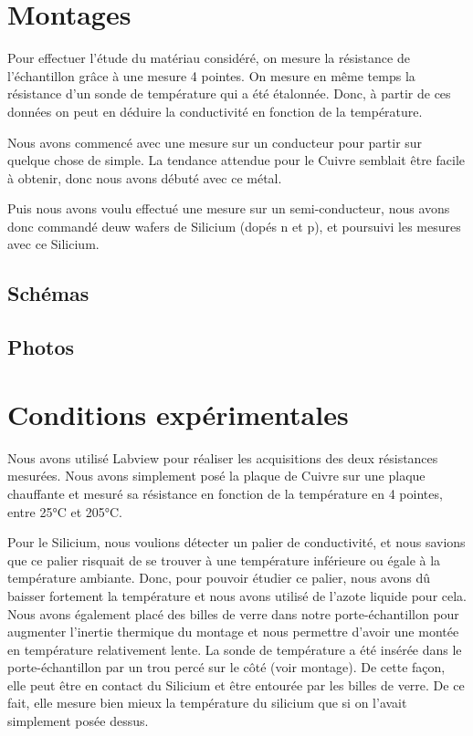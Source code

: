 \section*{Montages}
Pour effectuer l'étude du matériau considéré, on mesure la résistance de l'échantillon grâce à une mesure 4 pointes.
On mesure en même temps la résistance d'un sonde de température qui a été étalonnée.
Donc, à partir de ces données on peut en déduire la conductivité en fonction de la température.


Nous avons commencé avec une mesure sur un conducteur pour partir sur quelque chose de simple.
La tendance attendue pour le Cuivre semblait être facile à obtenir, donc nous avons débuté avec ce métal.


Puis nous avons voulu effectué une mesure sur un semi-conducteur, nous avons donc commandé deuw wafers de Silicium (dopés n et p), et poursuivi les mesures avec ce Silicium.


\subsection*{Schémas}

\subsection*{Photos}


\section*{Conditions expérimentales}
Nous avons utilisé Labview pour réaliser les acquisitions des deux résistances mesurées.
Nous avons simplement posé la plaque de Cuivre sur une plaque chauffante et mesuré sa résistance en fonction de la température en 4 pointes, entre 25°C et 205°C.


Pour le Silicium, nous voulions détecter un palier de conductivité, et nous savions que ce palier risquait de se trouver à une température inférieure ou égale à la température ambiante.
Donc, pour pouvoir étudier ce palier, nous avons dû baisser fortement la température et nous avons utilisé de l'azote liquide pour cela.
Nous avons également placé des billes de verre dans notre porte-échantillon pour augmenter l'inertie thermique du montage et nous permettre d'avoir une montée en température relativement lente.
La sonde de température a été insérée dans le porte-échantillon par un trou percé sur le côté (voir montage). De cette façon, elle peut être en contact du Silicium et être entourée par les billes de verre.
De ce fait, elle mesure bien mieux la température du silicium que si on l'avait simplement posée dessus.


